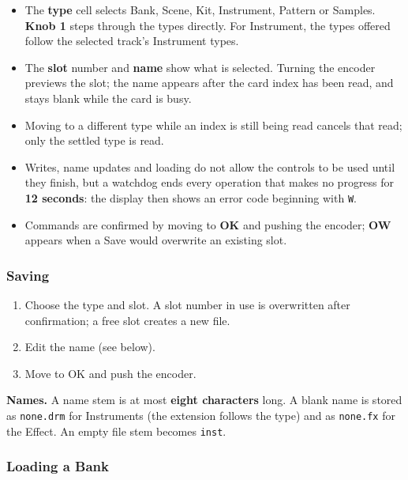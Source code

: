 \begin{itemize}
\tightlist
\item
  The \textbf{type} cell selects Bank, Scene, Kit, Instrument, Pattern
  or Samples. \textbf{Knob 1} steps through the types directly. For
  Instrument, the types offered follow the selected track's Instrument
  types.
\item
  The \textbf{slot} number and \textbf{name} show what is selected.
  Turning the encoder previews the slot; the name appears after the card
  index has been read, and stays blank while the card is busy.
\item
  Moving to a different type while an index is still being read cancels
  that read; only the settled type is read.
\item
  Writes, name updates and loading do not allow the controls to be used
  until they finish, but a watchdog ends every operation that makes no
  progress for \textbf{12 seconds}: the display then shows an error code
  beginning with \texttt{W}.
\item
  Commands are confirmed by moving to \textbf{OK} and pushing the
  encoder; \textbf{OW} appears when a Save would overwrite an existing
  slot.
\end{itemize}


\subsubsection{Saving}\label{saving}

\begin{enumerate}
\def\labelenumi{\arabic{enumi}.}
\tightlist
\item
  Choose the type and slot. A slot number in use is overwritten after
  confirmation; a free slot creates a new file.
\item
  Edit the name (see below).
\item
  Move to OK and push the encoder.
\end{enumerate}

\textbf{Names.} A name stem is at most \textbf{eight characters} long. A
blank name is stored as \texttt{none.drm} for Instruments (the extension
follows the type) and as \texttt{none.fx} for the Effect. An empty file
stem becomes \texttt{inst}.

\subsubsection{Loading a Bank}\label{loading-a-bank}

